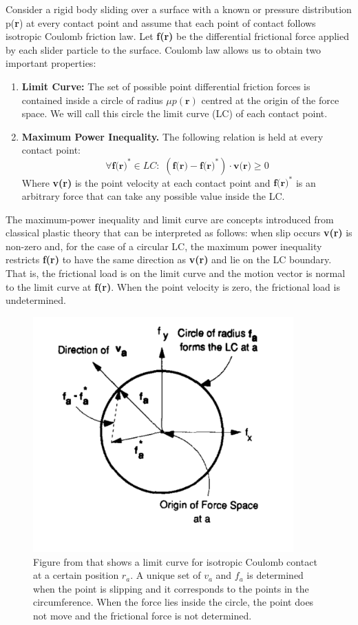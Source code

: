 \documentclass[12,twoside]{TFG-GM}
\theoremstyle{definition}
\theoremstyle{remark}
\begin{document}
Consider a rigid body sliding over a surface with a known or pressure distribution p(\textbf{r}) at every contact point and assume that each point of contact follows isotropic Coulomb friction law. Let \textbf{f(r)} be the differential frictional force applied by each slider particle to the surface. Coulomb law allows us to obtain two important properties:
\begin{enumerate}
\item {\textbf{Limit Curve:}} The set of possible point differential friction forces is contained inside a circle of radius $\mu  p(\textbf{r})$ centred at the origin of the force space. We will call this circle the limit curve (LC) of each contact point.
\item {\textbf{Maximum Power Inequality. }} The following relation is held at every contact point:
$$ \forall \textbf{f(r)}^* \in LC: \,\, (\textbf{f(r)} - \textbf{f(r)}^*)\cdot \textbf{v(r)} \geq 0 $$
Where \textbf{v(r)} is the point velocity at each contact point and $\textbf{f(r)}^*$ is an arbitrary force that can take any possible value inside the LC.
\end{enumerate}

The maximum-power inequality and limit curve are concepts introduced from classical plastic theory that can be interpreted as follows: when slip occurs \textbf{v(r)} is non-zero and, for the case of a circular LC, the maximum power inequality restricts \textbf{f(r)} to have the same direction as \textbf{v(r)} and lie on the LC boundary. That is, the frictional load is on the limit curve and the motion vector is normal to the limit curve at \textbf{f(r)}. When the point velocity is zero, the frictional load is undetermined.

\begin{figure}[htb!]
\begin{center}
\includegraphics[width=10cm]{isotropic_lc.png}
\end{center}
\caption[test caption]{\label{fig:iso_lc} \small{Figure from \protect\cite{planar_sliding1} that shows a limit curve for isotropic Coulomb contact at a certain position \textbf{$r_a$}. A unique set of \textbf{$v_a$} and \textbf{$f_a$} is determined when the point is slipping and it corresponds to the points in the circumference. When the force lies inside the circle, the point does not move and the frictional force is not determined.}}
\end{figure}
\end{document}
